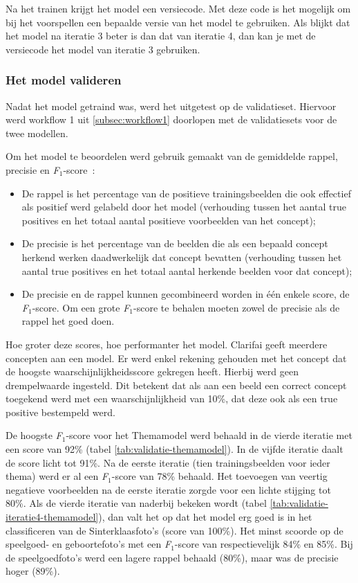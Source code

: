Na het trainen krijgt het model een versiecode. Met deze code is het mogelijk om bij het voorspellen een bepaalde versie van het model te gebruiken. Als blijkt dat het model na iteratie 3 beter is dan dat van iteratie 4, dan kan je met de versiecode het model van iteratie 3 gebruiken.

\subsubsection{Het model valideren}
\label{subsubsec:model-valideren}

Nadat het model getraind was, werd het uitgetest op de validatieset. Hiervoor werd workflow 1 uit \ref{subsec:workflow1} doorlopen met de validatiesets voor de twee modellen.

Om het model te beoordelen werd gebruik gemaakt van de gemiddelde rappel, precisie en \textit{F$_{1}$}-score~\autocite{Lievens2017}:
\begin{itemize}
    \item De rappel is het percentage van de positieve trainingsbeelden die ook effectief als positief werd gelabeld door het model (verhouding tussen het aantal true positives en het totaal aantal positieve voorbeelden van het concept);
    \item De precisie is het percentage van de beelden die als een bepaald concept herkend werken daadwerkelijk dat concept bevatten (verhouding tussen het aantal true positives en het totaal aantal herkende beelden voor dat concept);
    \item De precisie en de rappel kunnen gecombineerd worden in één enkele score, de \textit{F$_{1}$}-score. Om een grote \textit{F$_{1}$}-score te behalen moeten zowel de precisie als de rappel het goed doen.
\end{itemize}

Hoe groter deze scores, hoe performanter het model. Clarifai geeft meerdere concepten aan een model. Er werd enkel rekening gehouden met het concept dat de hoogste waarschijnlijkheidsscore gekregen heeft. Hierbij werd geen drempelwaarde ingesteld. Dit betekent dat als aan een beeld een correct concept toegekend werd met een waarschijnlijkheid van 10\%, dat deze ook als een true positive bestempeld werd. 

De hoogste \textit{F$_{1}$}-score voor het Themamodel werd behaald in de vierde iteratie met een score van 92\% (tabel \ref{tab:validatie-themamodel}). In de vijfde iteratie daalt de score licht tot 91\%. Na de eerste iteratie (tien trainingsbeelden voor ieder thema) werd er al een \textit{F$_{1}$}-score van 78\% behaald. Het toevoegen van veertig negatieve voorbeelden na de eerste iteratie zorgde voor een lichte stijging tot 80\%. Als de vierde iteratie van naderbij bekeken wordt (tabel \ref{tab:validatie-iteratie4-themamodel}), dan valt het op dat het model erg goed is in het classificeren van de Sinterklaasfoto’s (score van 100\%). Het minst scoorde op de speelgoed- en geboortefoto’s met een \textit{F$_{1}$}-score van respectievelijk 84\% en 85\%. Bij de speelgoedfoto’s werd een lagere rappel behaald (80\%), maar was de precisie hoger (89\%). 

